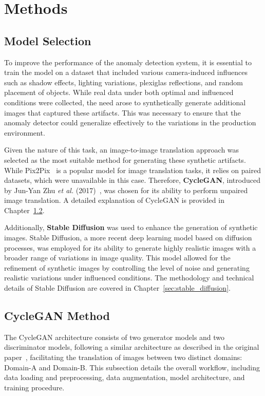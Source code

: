 \documentclass[12pt,DIV14,BCOR12mm,a4paper,footinclude=false,headinclude,parskip=half-,twoside,openright,cleardoublepage=empty,toc=index,bibliography=totoc,listof=totoc]{scrreprt}
\numberwithin{equation}{chapter}
\begin{document}
\section{Methods}

\subsection{Model Selection}

To improve the performance of the anomaly detection system, it is essential to train the model on a dataset that included various camera-induced influences such as shadow effects, lighting variations, plexiglas reflections, and random placement of objects. While real data under both optimal and influenced conditions were collected, the need arose to synthetically generate additional images that captured these artifacts. This was necessary to ensure that the anomaly detector could generalize effectively to the variations in the production environment.

Given the nature of this task, an image-to-image translation approach was selected as the most suitable method for generating these synthetic artifacts. While Pix2Pix~\cite{isola2017image} is a popular model for image translation tasks, it relies on paired datasets, which were unavailable in this case. Therefore, \textbf{CycleGAN}, introduced by Jun-Yan Zhu \textit{et al.} (2017)~\cite{zhu2017unpaired}, was chosen for its ability to perform unpaired image translation. A detailed explanation of CycleGAN is provided in Chapter~\ref{sec:cyclegan}.

Additionally, \textbf{Stable Diffusion} was used to enhance the generation of synthetic images. Stable Diffusion, a more recent deep learning model based on diffusion processes, was employed for its ability to generate highly realistic images with a broader range of variations in image quality. This model allowed for the refinement of synthetic images by controlling the level of noise and generating realistic variations under influenced conditions. The methodology and technical details of Stable Diffusion are covered in Chapter~\ref{sec:stable_diffusion}.

\subsection{CycleGAN Method}
\label{sec:cyclegan}
The CycleGAN architecture consists of two generator models and two discriminator models, following a similar architecture as described in the original paper~\cite{zhu2017unpaired}, facilitating the translation of images between two distinct domains: Domain-A and Domain-B. This subsection details the overall workflow, including data loading and preprocessing, data augmentation, model architecture, and training procedure.
\end{document}

